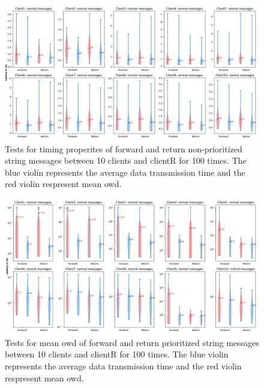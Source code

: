\begin{figure}
    \centering
    \includegraphics[width=\textheight]{figures/tests/priority_tests/violin_10clients_string_non_priority.png}\hfill 
    \caption{Tests for timing properites of forward and return non-prioritized string messages between 10 clients 
    and clientR for 100 times. The blue violin represents the average data transmission time and the red violin 
    respresent mean \gls{owd}.} \label{fig: priority-10clients-a}
\end{figure}
\begin{figure}
    \centering
    \includegraphics[width=\textheight]{figures/tests/priority_tests/log_violin_10clients_string_priority.png}\hfill 
    \caption{Tests for mean \gls{owd} of forward and return prioritized string messages between 10 clients 
    and clientR for 100 times. The blue violin represents the average data transmission time and the red violin 
    respresent mean \gls{owd}.} \label{fig: priority-10clients-b}
\end{figure}





